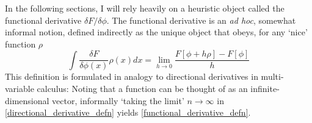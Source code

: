 In the following sections, I will rely heavily on a heuristic object called the functional derivative $\delta F/\delta \phi$. The functional derivative is an \emph{ad hoc}, somewhat informal notion, defined indirectly as the unique object that obeys, for any `nice' function $\rho$
\begin{equation}
\label{functional_derivative_defn}
    \int\frac{\delta F}{\delta \phi(x)}\rho(x)dx = \lim_{h \to 0} \frac{F[\phi + h\rho]-F[\phi]}{h}
\end{equation}
This definition is formulated in analogy to directional derivatives in multi-variable calculus: Noting that a function can be thought of as an infinite-dimensional vector, informally `taking the limit' $n \to \infty$ in \eqref{directional_derivative_defn} yields \eqref{functional_derivative_defn}.

